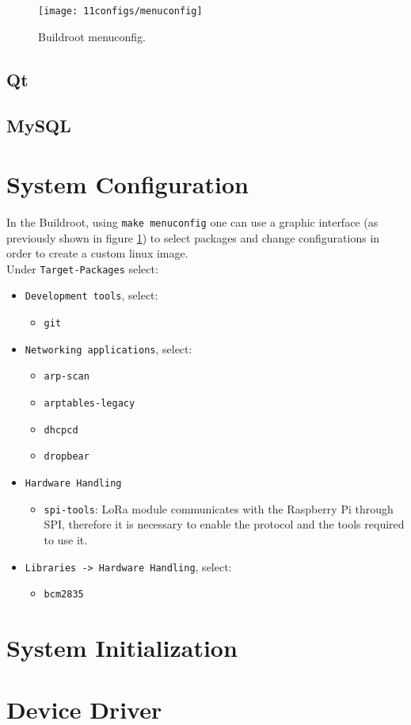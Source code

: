 \begin{figure}[H]
	\centering	
	\texttt{[image: 11configs/menuconfig]}
	\caption{Buildroot menuconfig.}
	\label{fig:menuconfig}
\end{figure}

\subsection{Qt}

\subsection{MySQL}

\clearpage
\section{System Configuration}
In the Buildroot, using \verb|make menuconfig| one can use a graphic interface (as previously shown in figure \ref{fig:menuconfig}) to select packages and change configurations in order to create a custom linux image.\\

Under \verb|Target-Packages| select:
\begin{itemize}
	\item \verb|Development tools|, select:
	\begin{itemize}
		\item \verb|git|
	\end{itemize}

	\item \verb|Networking applications|, select:
	\begin{itemize}
		\item \verb|arp-scan|
		\item \verb|arptables-legacy|
		\item \verb|dhcpcd|
		\item \verb|dropbear|
	\end{itemize}

	\item \verb|Hardware Handling|
	\begin{itemize}
		\item \verb|spi-tools|: LoRa module communicates with the Raspberry Pi through SPI, therefore it is necessary to  enable the protocol and the tools required to use it.
	\end{itemize}
	
	\item \verb|Libraries -> Hardware Handling|, select:
	\begin{itemize}
		\item \verb|bcm2835|
	\end{itemize}	
\end{itemize}

\clearpage
\section{System Initialization}

\clearpage
\section{Device Driver}